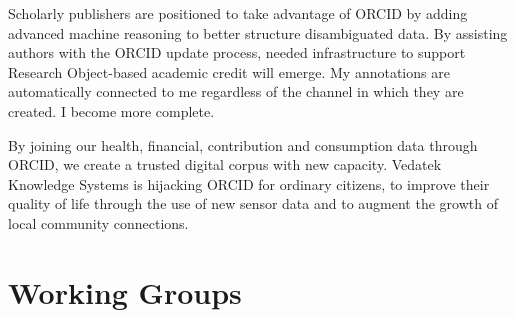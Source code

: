 \documentclass[a4paper,UKenglish]{dagrep}
\begin{document}
Scholarly publishers are positioned to take advantage of ORCID by adding 
advanced machine reasoning to better structure disambiguated data.  By 
assisting authors with the ORCID update process, needed infrastructure to 
support Research Object-based academic credit will emerge.  My annotations are 
automatically connected to me regardless of the channel in which they are 
created.  I become more complete.

By joining our health, financial, contribution and consumption data through 
ORCID, we create a trusted digital corpus with new capacity.  Vedatek Knowledge 
Systems is hijacking ORCID for ordinary citizens, to improve their quality of life 
through the use of new sensor data and to augment the growth of local 
community connections. 




\section{Working Groups }
\end{document}
